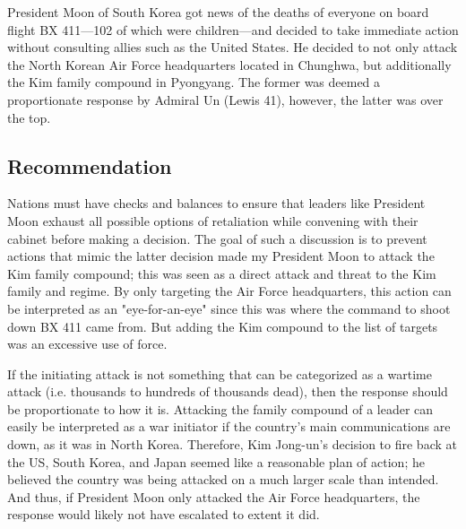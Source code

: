 \documentclass[12pt]{turabian-researchpaper}
\begin{document}
	President Moon of South Korea got news of the deaths of everyone on board flight BX 411—102 of which were children—and decided to take immediate action without consulting allies such as the United States. He decided to not only attack the North Korean Air Force headquarters located in Chunghwa, but additionally the Kim family compound in Pyongyang. The former was deemed a proportionate response by Admiral Un (Lewis 41), however, the latter was over the top.

\subsection{Recommendation}
	
	Nations must have checks and balances to ensure that leaders like President Moon exhaust all possible options of retaliation while convening with their cabinet before making a decision. The goal of such a discussion is to prevent actions that mimic the latter decision made my President Moon to attack the Kim family compound; this was seen as a direct attack and threat to the Kim family and regime. By only targeting the Air Force headquarters, this action can be interpreted as an "eye-for-an-eye" since this was where the command to shoot down BX 411 came from. But adding the Kim compound to the list of targets was an excessive use of force. 

	If the initiating attack is not something that can be categorized as a wartime attack (i.e. thousands to hundreds of thousands dead), then the response should be proportionate to how it is. Attacking the family compound of a leader can easily be interpreted as a war initiator if the country's main communications are down, as it was in North Korea. Therefore, Kim Jong-un's decision to fire back at the US, South Korea, and Japan seemed like a reasonable plan of action; he believed the country was being attacked on a much larger scale than intended. And thus, if President Moon only attacked the Air Force headquarters, the response would likely not have escalated to extent it did.

\end{document}
